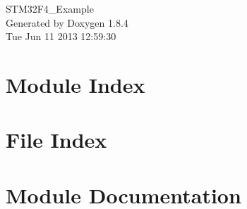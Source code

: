 \documentclass[twoside]{book}
\newcommand{\clearemptydoublepage}{%
  \newpage{\pagestyle{empty}\cleardoublepage}%
}
\begin{document}
\hypersetup{pageanchor=false}
\begin{titlepage}
\vspace*{7cm}
\begin{center}%
{\Large S\-T\-M32\-F4\-\_\-\-Example }\\
\vspace*{1cm}
{\large Generated by Doxygen 1.8.4}\\
\vspace*{0.5cm}
{\small Tue Jun 11 2013 12:59:30}\\
\end{center}
\end{titlepage}
\clearemptydoublepage
\tableofcontents
\clearemptydoublepage
{}
\hypersetup{pageanchor=true}

\chapter{Module Index}

\chapter{File Index}

\chapter{Module Documentation}































\end{document}
